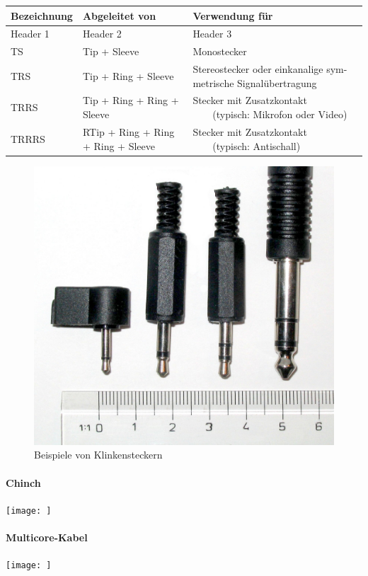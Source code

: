 \begin{longtable}{|p{}|p{}|p{}|}
\hline
\rowcolor{gray!50} Bezeichnung & Abgeleitet von & Verwendung für \\
\hline
\endfirsthead

\hline
Header 1 & Header 2 & Header 3 \\
\hline
\endhead

\hline
\endfoot

\hline
\endlastfoot

TS & Tip + Sleeve & Monostecker \\
\hline
TRS & Tip + Ring + Sleeve & Stereostecker oder einkanalige sym- metrische Signalübertragung \\
\hline
TRRS & Tip + Ring + Ring + Sleeve & Stecker mit Zusatzkontakt ~~~~(typisch: Mikrofon oder Video) \\
\hline
TRRRS & RTip + Ring + Ring + Ring + Sleeve & Stecker mit Zusatzkontakt ~~~~(typisch: Antischall) \\
\hline

\end{longtable}
\cite{dewiki:245747795}


\begin{figure}[h]
    \centering
    \includegraphics[width=1\textwidth]{Bilder/Medientechnik/Photo-audiojacks.jpg}
    \caption{Beispiele von Klinkensteckern}
    \label{fig:Klinkenstecker}
\end{figure}
\newpage

\paragraph{Chinch}
\texttt{[image: ]}



\paragraph{Multicore-Kabel}
\texttt{[image: ]}